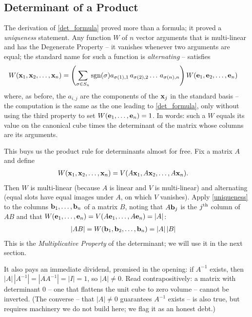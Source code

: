 \documentclass{article}
\begin{document}
\subsection{Determinant of a Product}
The derivation of \eqref{det_formula} proved more than a formula; it proved a
{\em uniqueness\/} statement. Any function $W$ of $n$ vector arguments that is
multi-linear and has the Degenerate Property -- it vanishes whenever two
arguments are equal; the standard name for such a function is
{\em alternating\/} -- satisfies
\begin{align}
  W({\bf x}_1, {\bf x}_2, \ldots, {\bf x}_n)
  &= \left( \sum_{\sigma \in S_n} {\rm sgn}(\sigma)
        a_{\sigma(1),1} \, a_{\sigma(2),2} \ldots \, a_{\sigma(n),n} \right)
     W({\bf e}_1, {\bf e}_2, \ldots, {\bf e}_n) \label{uniqueness}
\end{align}
where, as before, the $a_{i,j}$ are the components of the ${\bf x}_j$ in the
standard basis -- the computation is the same as the one leading to
\eqref{det_formula}, only without using the third property to set
$W({\bf e}_1, \ldots, {\bf e}_n) = 1$. In words: such a $W$ equals its value
on the canonical cube times the determinant of the matrix whose columns are
its arguments.

This buys us the product rule for determinants almost for free. Fix a matrix
$A$ and define
\begin{align*}
  W({\bf x}_1, {\bf x}_2, \ldots, {\bf x}_n)
     &= V(A {\bf x}_1, A {\bf x}_2, \ldots, A {\bf x}_n).
\end{align*}
Then $W$ is multi-linear (because $A$ is linear and $V$ is multi-linear) and
alternating (equal slots have equal images under $A$, on which $V$
vanishes). Apply
\eqref{uniqueness} to the columns ${\bf b}_1, \ldots, {\bf b}_n$ of a matrix
$B$, noting that $A {\bf b}_j$ is the $j^{\rm th}$ column of $AB$ and that
$W({\bf e}_1, \ldots, {\bf e}_n) = V(A {\bf e}_1, \ldots, A {\bf e}_n) = |A|$:
\begin{align}
  |AB| &= W({\bf b}_1, {\bf b}_2, \ldots, {\bf b}_n) = |A| \, |B| \label{mult_prop}
\end{align}
This is the {\em Multiplicative Property\/} of the determinant; we will use
it in the next section.

It also pays an immediate dividend, promised in the opening: if $A^{-1}$ exists,
then $|A| \, |A^{-1}| = |A A^{-1}| = |I| = 1$, so $|A| \neq 0$. Read
contrapositively: a matrix with determinant $0$ -- one that flattens the unit
cube to zero volume -- cannot be inverted. (The converse -- that $|A| \neq 0$
guarantees $A^{-1}$ exists -- is also true, but requires machinery we do not
build here; we flag it as an honest debt.)
\end{document}
